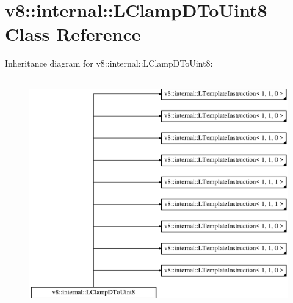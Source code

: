 \hypertarget{classv8_1_1internal_1_1_l_clamp_d_to_uint8}{}\section{v8\+:\+:internal\+:\+:L\+Clamp\+D\+To\+Uint8 Class Reference}
\label{classv8_1_1internal_1_1_l_clamp_d_to_uint8}
Inheritance diagram for v8\+:\+:internal\+:\+:L\+Clamp\+D\+To\+Uint8\+:\begin{figure}[H]
\begin{center}
\leavevmode
\includegraphics[height=10.000000cm]{classv8_1_1internal_1_1_l_clamp_d_to_uint8}
\end{center}
\end{figure}
